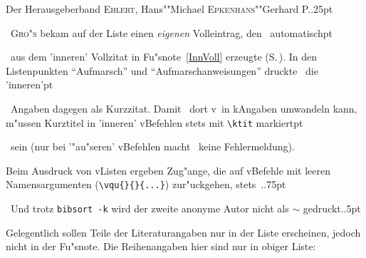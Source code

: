 \documentclass[12pt,a4paper]{article}
\newcommand{\pdfko}[1]{\kern #1pt
                          \strut\ignorespaces}%
\begin{document}
\printnumvqu

\noindent
Der Herausgeberband 
\textsc{Ehlert}, Hans\baslash""Michael \textsc{Epkenhans}\baslash""Gerhard P.\pdfko{.25}\  
\textsc{Gro"s} 
bekam auf der Liste einen \textit{eigenen} Volleintrag, den \BibArts\ automatisch\pdfko{1}\  
aus dem 'inneren' Vollzitat in Fu"snote~\ref{InnVoll} erzeugte 
(S.\,\pageref{InnVoll}). In den Listenpunkten "`Aufmarsch"' und 
"`Aufmarschanweisungen"' druckte \BibArts\ die 'inneren'\pdfko{1}\ 
Angaben dagegen als Kurzzitat. Damit \BibArts\ dort v\hy\ in k\fhy Angaben 
umwandeln kann, m"ussen Kurztitel in 'inneren' v\fhy Befehlen stets mit 
\verb|\ktit| markiert\pdfko{1.25}\  
sein (nur bei '"au"seren' v\fhy Befehlen macht \BibArts\ keine Fehlermeldung). 

Beim Ausdruck von v\fhy Listen ergeben Zug"ange, die auf v\fhy Befehle mit leeren 
Namensargumenten  (\verb|\vqu{}{}{...}|) zur"uckgehen, stets \,.\pdfko{.75}\  
Und trotz \verb|bibsort -k| wird der zweite anonyme Autor nicht als $\sim$ gedruckt.\pdfko{.5}


\vspace{2ex}\noindent
Gelegentlich sollen Teile der Literaturangaben nur in der Liste erscheinen, jedoch 
nicht in der Fu"snote. Die Reihenangaben hier sind nur in obiger Liste:
\end{document}
